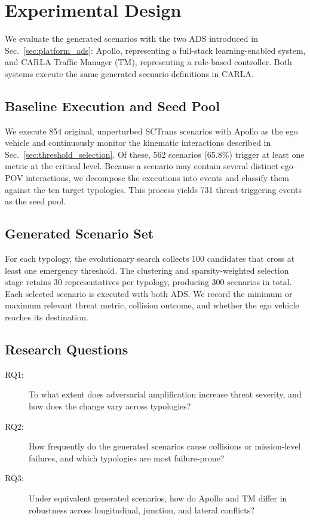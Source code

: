 \section{Experimental Design}
\label{sec:experimental_design}

We evaluate the generated scenarios with the two ADS introduced in Sec.~\ref{sec:platform_ads}: Apollo, representing a full-stack learning-enabled system, and CARLA Traffic Manager (TM), representing a rule-based controller. Both systems execute the same generated scenario definitions in CARLA.

\subsection{Baseline Execution and Seed Pool}

We execute 854 original, unperturbed SCTrans scenarios with Apollo as the ego vehicle and continuously monitor the kinematic interactions described in Sec.~\ref{sec:threshold_selection}. Of these, 562 scenarios (65.8\%) trigger at least one metric at the critical level. Because a scenario may contain several distinct ego--POV interactions, we decompose the executions into events and classify them against the ten target typologies. This process yields 731 threat-triggering events as the seed pool.

\subsection{Generated Scenario Set}

For each typology, the evolutionary search collects 100 candidates that cross at least one emergency threshold. The clustering and sparsity-weighted selection stage retains 30 representatives per typology, producing 300 scenarios in total. Each selected scenario is executed with both ADS. We record the minimum or maximum relevant threat metric, collision outcome, and whether the ego vehicle reaches its destination.

\subsection{Research Questions}

\begin{description}
  \item[RQ1:] To what extent does adversarial amplification increase threat severity, and how does the change vary across typologies?
  \item[RQ2:] How frequently do the generated scenarios cause collisions or mission-level failures, and which typologies are most failure-prone?
  \item[RQ3:] Under equivalent generated scenarios, how do Apollo and TM differ in robustness across longitudinal, junction, and lateral conflicts?
\end{description}

